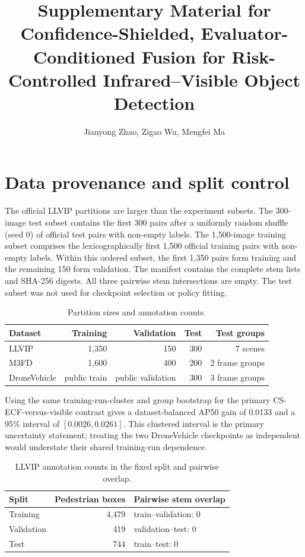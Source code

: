 \documentclass[11pt]{article}
\title{Supplementary Material for\\Confidence-Shielded,
Evaluator-Conditioned Fusion for Risk-Controlled Infrared--Visible Object
Detection}
\author{Jianyong Zhao, Zigao Wu, Mengfei Ma}
\date{}
\begin{document}
\maketitle
\sloppy

\section{Data provenance and split control}

The official LLVIP partitions are larger than the experiment subsets. The
300-image test subset contains the first 300 pairs after a uniformly random
shuffle (seed 0) of official test pairs with non-empty labels. The
1,500-image training subset comprises the lexicographically first 1,500
official training pairs with non-empty labels. Within this ordered subset, the
first 1,350 pairs form training and the remaining 150 form validation. The
manifest contains the complete stem lists and SHA-256 digests. All three
pairwise stem intersections are empty. The test subset was not used for
checkpoint selection or policy fitting.

\begin{table}[h]
\centering
\small
\caption{Partition sizes and annotation counts.}
\begin{tabular}{@{}lrrrr@{}}
\toprule
Dataset & Training & Validation & Test & Test groups \\
\midrule
LLVIP & 1,350 & 150 & 300 & 7 scenes \\
M3FD & 1,600 & 400 & 200 & 2 frame groups \\
DroneVehicle & public train & public validation & 300 & 3 frame groups \\
\bottomrule
\end{tabular}
\end{table}

Using the same training-run-cluster and group bootstrap for the primary
CS-ECF-versus-visible contrast gives a dataset-balanced AP50 gain of 0.0133 and
a 95\% interval of \([0.0026,0.0261]\). This clustered interval is the primary
uncertainty statement; treating the two DroneVehicle checkpoints as independent
would understate their shared training-run dependence.

\begin{table}[h]
\centering
\small
\caption{LLVIP annotation counts in the fixed split and pairwise overlap.}
\begin{tabular}{@{}lrl@{}}
\toprule
Split & Pedestrian boxes & Pairwise stem overlap \\
\midrule
Training & 4,479 & train--validation: 0 \\
Validation & 419 & validation--test: 0 \\
Test & 744 & train--test: 0 \\
\bottomrule
\end{tabular}
\end{table}
\end{document}

